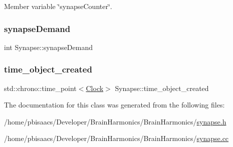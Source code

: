 Member variable \char`\"{}synapse\+Counter\char`\"{}. 

\mbox{\label{classSynapse_a9395cb1a49c5b736647b17dcfa23895d}} 
\subsubsection{\texorpdfstring{synapse\+Demand}{synapseDemand}}
{\footnotesize\ttfamily int Synapse\+::synapse\+Demand\hspace{0.3cm}{\ttfamily [private]}}

\mbox{\label{classSynapse_afbfdba5e6a7bfaf688189d07a9dd62a0}} 
\subsubsection{\texorpdfstring{time\+\_\+object\+\_\+created}{time\_object\_created}}
{\footnotesize\ttfamily std\+::chrono\+::time\+\_\+point$<$\mbox{\hyperlink{universe_8h_a0ef8d951d1ca5ab3cfaf7ab4c7a6fd80}{Clock}}$>$ Synapse\+::time\+\_\+object\+\_\+created\hspace{0.3cm}{\ttfamily [private]}}



The documentation for this class was generated from the following files\+:\begin{DoxyCompactItemize}
\item 
/home/pbisaacs/\+Developer/\+Brain\+Harmonics/\+Brain\+Harmonics/\mbox{\hyperlink{synapse_8h}{synapse.\+h}}\item 
/home/pbisaacs/\+Developer/\+Brain\+Harmonics/\+Brain\+Harmonics/\mbox{\hyperlink{synapse_8cc}{synapse.\+cc}}\end{DoxyCompactItemize}
